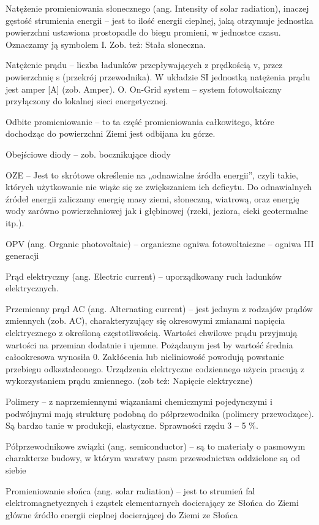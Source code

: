 \documentclass[12pt,a4paper]{article}
\begin{document}
Natężenie promieniowania słonecznego (ang. Intensity of solar radiation), inaczej gęstość strumienia energii – jest to ilość energii cieplnej, jaką otrzymuje jednostka powierzchni ustawiona prostopadle do biegu promieni, w jednostce czasu. Oznaczamy ją symbolem I. Zob. też: Stała słoneczna.

Natężenie prądu – liczba ładunków przepływających z prędkością v, przez powierzchnię s (przekrój przewodnika). W układzie SI jednostką natężenia prądu jest amper [A] (zob. Amper).
O.
On-Grid system – system fotowoltaiczny przyłączony do lokalnej sieci energetycznej.

Odbite promieniowanie – to ta część promieniowania całkowitego, które dochodząc do powierzchni Ziemi jest odbijana ku górze.

Obejściowe diody – zob. bocznikujące diody

OZE –  Jest to skrótowe określenie na „odnawialne źródła energii”, czyli takie, których użytkowanie nie wiąże się ze zwiększaniem ich deficytu. Do odnawialnych źródeł energii zaliczamy energię masy ziemi, słoneczną, wiatrową, oraz energię wody zarówno powierzchniowej jak i głębinowej (rzeki, jeziora, cieki geotermalne itp.).

OPV (ang. Organic photovoltaic) – organiczne ogniwa fotowoltaiczne – ogniwa III generacji


Prąd elektryczny (ang. Electric current) – uporządkowany ruch ładunków elektrycznych.

Przemienny prąd AC (ang. Alternating current) – jest jednym z rodzajów prądów zmiennych (zob. AC), charakteryzujący się okresowymi zmianami napięcia elektrycznego z określoną częstotliwością. Wartości chwilowe prądu przyjmują wartości na przemian dodatnie i ujemne. Pożądanym jest by wartość średnia całookresowa wynosiła 0. Zakłócenia lub nieliniowość powodują powstanie przebiegu odkształconego. Urządzenia elektryczne codziennego użycia pracują z wykorzystaniem prądu zmiennego. (zob też: Napięcie elektryczne)

Polimery – z naprzemiennymi wiązaniami chemicznymi pojedynczymi i podwójnymi mają strukturę podobną do półprzewodnika (polimery przewodzące). Są bardzo tanie w produkcji, elastyczne. Sprawności rzędu 3 – 5 \%.

Półprzewodnikowe związki (ang. semiconductor) – są to materiały o pasmowym charakterze budowy, w którym warstwy pasm przewodnictwa oddzielone są od siebie

Promieniowanie słońca (ang. solar radiation) – jest to strumień fal elektromagnetycznych i cząstek elementarnych docierający ze Słońca do Ziemi główne źródło energii cieplnej docierającej do Ziemi ze Słońca
\end{document}
